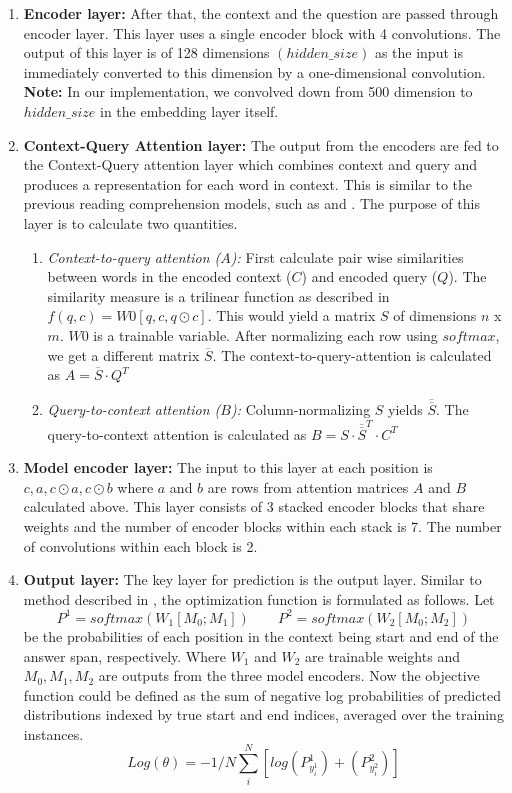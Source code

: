 \documentclass{article}
\begin{document}
\begin{enumerate}
  \item {\textbf{Encoder layer:} After that, the context and the question are passed through encoder layer. This layer uses a single encoder block with 4 convolutions. The output of this layer is of 128 dimensions $(hidden\_size)$ as the input is immediately converted to this dimension by a one-dimensional convolution. \textbf{Note:} In our implementation, we convolved down from 500 dimension to $hidden\_size$ in the embedding layer itself.}
  \item {\textbf{Context-Query Attention layer:} The output from the encoders are fed to the Context-Query attention layer which combines context and query and produces a representation for each word in context. This is similar to the previous reading comprehension models, such as \cite{weissenborn2017making} and \cite{chen2017reading}. The purpose of this layer is to calculate two quantities.}
  	\begin{enumerate}  
	\item \textit{Context-to-query attention ($A$):} First calculate pair wise similarities between words in the encoded context ($C$) and encoded query ($Q$). The similarity measure is a trilinear function as described in \cite{weissenborn2017making} $f(q,c)= W0[q,c, q \odot c]$. This would yield a matrix $S$ of dimensions $n$ x $m$. $W0$ is a trainable variable. After normalizing each row using $softmax$, we get a different matrix $\overline S$. The context-to-query-attention is calculated as $A = \overline S \cdot Q^T$
	\item \textit{Query-to-context attention ($B$):} Column-normalizing $S$ yields $\overline {\overline S}$. The query-to-context attention is calculated as $B = S \cdot \overline {\overline S} ^T \cdot C^T$
	\end{enumerate}  
	\item \textbf{Model encoder layer:} The input to this layer at each position is $c,a,c \odot a,c \odot b$ where $a$ and $b$ are rows from attention matrices $A$ and $B$ calculated above. This layer consists of 3 stacked encoder blocks that share weights and the number of encoder blocks within each stack is 7. The number of convolutions within each block is 2.
	\item \textbf{Output layer:} The key layer for prediction is the output layer. Similar to method described in \cite{seo2016bidirectional}, the optimization function is formulated as follows. Let $$P^1 = \textit{softmax}(W_1[M_0 ; M_1]) \qquad P^2 = \textit{softmax}(W_2[M_0 ; M_2])$$ be the probabilities of each position in the context being start and end of the answer span, respectively. Where $W_1$ and $W_2$ are trainable weights and $M_0 , M_1 , M_2$ are outputs from the three model encoders. Now the objective function could be defined as the sum of negative log probabilities of predicted distributions indexed by true start and end indices, averaged over the training instances. $$Log(\theta) = - 1/N \sum_i^N [log(P^1_{{y^1_i}}) + (P^2_{{y^2_i}})]$$

\end{enumerate}
\end{document}
